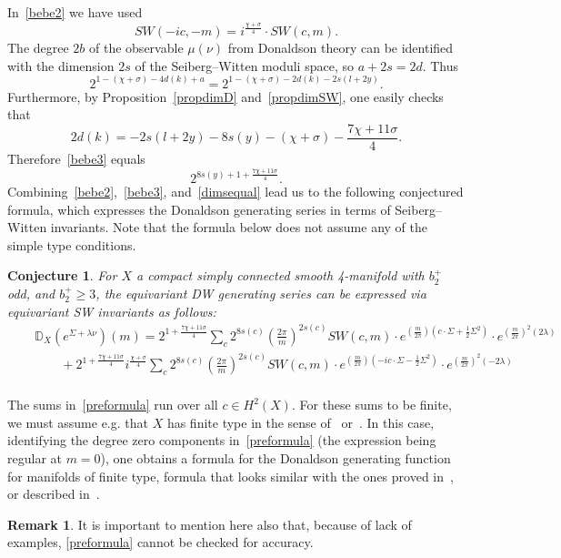 \documentclass[a4paper,12pt,reqno,sumlimits]{amsart}
\theoremstyle{plain}
\newtheorem{conj}[thm]{Conjecture}
\theoremstyle{definition}
\newtheorem{rem}[thm]{Remark}
\newcommand{\D}{{\mathbb D}}
\newcommand{\1}{{\bf 1}}
\numberwithin{equation}{section}
\begin{document}
In~\eqref{bebe2} we have used
$$
SW(-ic,-m)=i^{\frac{\chi+\sigma}{4}}\cdot SW(c,m).
$$
The degree $2b$ of the observable $\mu(\nu)$ from Donaldson theory can be
identified with the dimension $2s$ of the Seiberg--Witten moduli space, so
$a+2s=2d$.  Thus
\begin{equation}
  \label{bebe3}
  2^{1-(\chi+\sigma) -4d(k) + a}=2^{1-(\chi+\sigma) -2d(k) -2s(l+2y)}.
\end{equation}
Furthermore, by Proposition~\ref{propdimD} and~\eqref{propdimSW}, one easily
checks that
$$
2d(k)= -2s(l+2y) -8s(y) - (\chi+\sigma) - \frac{7\chi+11\sigma}{4}.
$$
Therefore~\eqref{bebe3} equals 
\begin{equation}
  \label{dimsequal}
  2^{8s(y) + 1+ \frac{7\chi+11\sigma}{4}}.
\end{equation}
Combining~\eqref{bebe2},~\eqref{bebe3}, and~\eqref{dimsequal} lead us to the
following conjectured formula, which expresses the Donaldson generating
series in terms of Seiberg--Witten invariants. Note that the formula below
does not assume any of the simple type conditions.
\begin{conj}   For $X$ a compact simply connected smooth 4-manifold with $b_2^+$ odd,
  and $b_2^+\ge 3$, the equivariant DW generating series can be expressed via
  equivariant SW invariants as follows:
  \begin{eqnarray}
    \label{preformula}
    &&\D_X\left(e^{\Sigma+\lambda\nu}\right)(m) = 2^{1+\frac{7\chi+11\sigma}{4}}
    \sum_c 2^{8s(c)}\left(\frac{2\pi}{m}\right)^{2s(c)}
    SW(c,m)\cdot e^{\left(\frac{m}{2\pi}\right)(c\cdot\Sigma+\frac{1}{2}\Sigma^2)}
    \cdot e^{\left(\frac{m}{2\pi}\right)^2 (2\lambda)}\nonumber\\
    &&\qquad +2^{1+\frac{7\chi+11\sigma}{4}} i^{\frac{\chi+\sigma}{4}}
    \sum_c 2^{8s(c)}\left(\frac{2\pi}{m}\right)^{2s(c)}
    SW(c,m)\cdot e^{\left(\frac{m}{2\pi}\right)(-ic\cdot\Sigma-\frac{1}{2}\Sigma^2)}
    \cdot e^{\left(\frac{m}{2\pi}\right)^2 (-2\lambda)}\nonumber\\
    \,
  \end{eqnarray}
\end{conj}
The sums in~\eqref{preformula} run over all $c\in H^2(X)$.  For these sums to
be finite, we must assume e.g. that $X$ has finite type in the sense
of~\cite{km3} or~\cite{munoz}. In this case, identifying the degree zero
components in~\eqref{preformula} (the expression being regular at $m=0$), one
obtains a formula for the Donaldson generating function for manifolds of
finite type, formula that looks similar with the ones proved in~\cite{munoz},
or described in~\cite{km3}.
\begin{rem}
  It is important to mention here also that, because of lack of examples,
  \eqref{preformula} cannot be checked for accuracy.
\end{rem}
\end{document}
